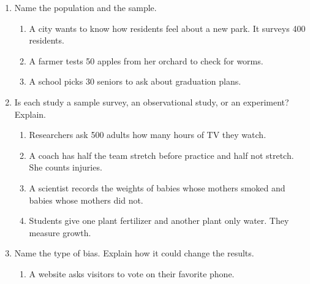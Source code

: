 \documentclass[11pt]{article}
\begin{document}
\newpage
\begin{enumerate}

\item Name the population and the sample.
\begin{enumerate}[itemsep=3em]
  \item A city wants to know how residents feel about a new park. It surveys 400 residents.

  \item A farmer tests 50 apples from her orchard to check for worms.

  \item A school picks 30 seniors to ask about graduation plans.

\end{enumerate}
\work{1.5em}

\item Is each study a sample survey, an observational study, or an experiment? Explain.
\begin{enumerate}[itemsep=3em]
  \item Researchers ask 500 adults how many hours of TV they watch.

  \item A coach has half the team stretch before practice and half not stretch. She counts injuries.

  \item A scientist records the weights of babies whose mothers smoked and babies whose mothers did not.

  \item Students give one plant fertilizer and another plant only water. They measure growth.

\end{enumerate}

\newpage
\item Name the type of bias. Explain how it could change the results.
\begin{enumerate}[itemsep=2.4em]
  \item A website asks visitors to vote on their favorite phone.


\end{enumerate}
\end{enumerate}
\end{document}
